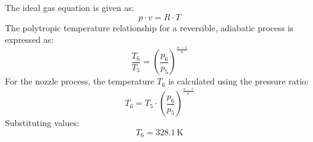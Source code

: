The ideal gas equation is given as:  
\[
p \cdot v = R \cdot T
\]  
The polytropic temperature relationship for a reversible, adiabatic process is expressed as:  
\[
\frac{T_6}{T_5} = \left( \frac{p_6}{p_5} \right)^{\frac{n-1}{n}}
\]  
For the nozzle process, the temperature \( T_6 \) is calculated using the pressure ratio:  
\[
T_6 = T_5 \cdot \left( \frac{p_6}{p_5} \right)^{\frac{\kappa-1}{\kappa}}
\]  
Substituting values:  
\[
T_6 = 328.1 \, \text{K}
\]